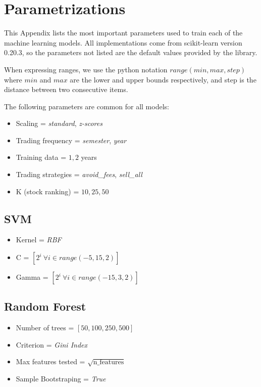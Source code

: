 \chapter{Parametrizations}
\label{app:parametrizations}

This Appendix lists the most important parameters used to train each of the machine learning models. All implementations come from scikit-learn version 0.20.3, so the parameters not listed are the default values provided by the library.

When expressing ranges, we use the python notation $range(min, max, step)$ where $min$ and $max$ are the lower and upper bounds respectively, and step is the distance between two consecutive items.

The following parameters are common for all models:

\begin{itemize}
    \item Scaling = \textit{standard}, \textit{z-scores}
    \item Trading frequency = \textit{semester}, \textit{year}
    \item Training data = $1, 2$ years
    \item Trading strategies = \textit{avoid\_fees}, \textit{sell\_all}
    \item K (stock ranking) = $10, 25, 50$
\end{itemize}

\section{SVM}
\begin{itemize}
    \item Kernel = \textit{RBF}
    \item C = $[2^i~ \forall i \in range(-5, 15, 2)]$
    \item Gamma = $[2^i~ \forall i \in range(-15, 3, 2)]$
\end{itemize}


\section{Random Forest}
\begin{itemize}
    \item Number of trees = $[50, 100, 250, 500]$
    \item Criterion = \textit{Gini Index}
    \item Max features tested = $\sqrt{\text{n\_features} } $
    \item Sample Bootstraping = \textit{True}
\end{itemize}



